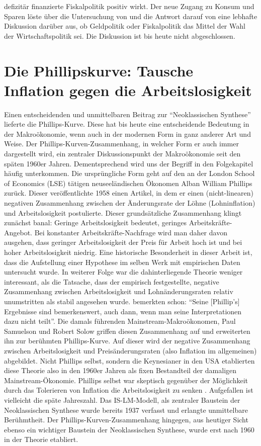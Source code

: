 defizitär finanzierte Fiskalpolitik positiv wirkt. Der neue Zugang zu Konsum und Sparen löste über die Untersuchung von \textcite{Friedman1963b} und die Antwort darauf von \textcite{Ando1965} eine lebhafte Diskussion darüber aus, ob Geldpolitik oder Fiskalpolitik das Mittel der Wahl der Wirtschaftspolitik sei. Die Diskussion ist bis heute nicht abgeschlossen. 


\section{Die Phillipskurve: Tausche Inflation gegen die Arbeitslosigkeit} \label{sec: Phillips}

Einen entscheidenden und unmittelbaren Beitrag zur "`Neoklassischen Synthese"' lieferte die Phillips-Kurve. Diese hat bis heute eine entscheidende Bedeutung in der Makroökonomie, wenn auch in der modernen Form in ganz anderer Art und Weise. Der Phillips-Kurven-Zusammenhang, in welcher Form er auch immer dargestellt wird, ein zentraler Diskussionspunkt der Makroökonomie seit den späten 1960er Jahren. Dementsprechend wird uns der Begriff in den Folgekapitel häufig unterkommen. Die ursprüngliche Form geht auf den an der London School of Economics (LSE) tätigen neuseeländischen Ökonomen Alban William Phillips zurück. Dieser veröffentlichte 1958 einen Artikel, in dem er einen (nicht-linearen) negativen Zusammenhang zwischen der Änderungsrate der Löhne (Lohninflation) und Arbeitslosigkeit postulierte. Dieser grundsätzliche Zusammenhang klingt zunächst banal: Geringe Arbeitslosigkeit bedeutet, geringes Arbeitskräfte-Angebot. Bei konstanter Arbeitskräfte-Nachfrage wird man daher davon ausgehen, dass geringer Arbeitslosigkeit der Preis für Arbeit hoch ist und bei hoher Arbeitslosigkeit niedrig. Eine historische Besonderheit in dieser Arbeit \parencite{Phillips1958} ist, dass die Aufstellung einer Hypothese im selben Werk mit empirischen Daten untersucht wurde. In weiterer Folge war die dahinterliegende Theorie weniger interessant, als die Tatsache, dass der empirisch festgestellte, negative Zusammenhang zwischen Arbeitslosigkeit und Lohnänderungsraten relativ unumstritten als stabil angesehen wurde. \textcite[S. 186]{Samuelson1960} bemerkten schon: "`Seine [Phillip's] Ergebnisse sind bemerkenswert, auch dann, wenn man seine Interpretationen dazu nicht teilt"'. Die damals führenden Mainstream-Makroökonomen, Paul Samuelson und Robert Solow griffen diesen Zusammenhang auf und erweiterten ihn zur berühmten Phillips-Kurve. Auf dieser wird der negative Zusammenhang zwischen Arbeitslosigkeit und Preisänderungsraten (also Inflation im allgemeinen) abgebildet. Nicht Phillips selbst, sondern die Keynesianer in den USA etablierten diese Theorie also in den 1960er Jahren als fixen Bestandteil der damaligen Mainstream-Ökonomie. Phillips selbst war skeptisch gegenüber der Möglichkeit durch das Tolerieren von Inflation die Arbeitslosigkeit zu senken \parencite[S. 142]{Snowdon2005}. Aufgefallen ist vielleicht die späte Jahreszahl. Das IS-LM-Modell, als zentraler Baustein der Neoklassischen Synthese wurde bereits 1937 verfasst und erlangte unmittelbare Berühmtheit. Der Phillips-Kurven-Zusammenhang hingegen, aus heutiger Sicht ebenso ein wichtiger Baustein der Neoklassischen Synthese, wurde erst nach 1960 in der Theorie etabliert.
